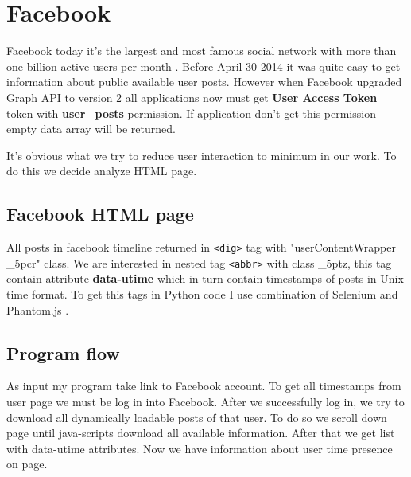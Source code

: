 \section{Facebook}

Facebook today it's the largest and most famous social network with more than one billion active users per month \cite{facebookStats}. Before April 30 2014 it was quite easy to get information about public available user posts. However when Facebook upgraded  Graph API to version 2 all applications now must get \textbf{User Access Token} token with \textbf{user\_posts} permission. If application don't get this permission empty data array will be returned. \par It's obvious what we try to reduce user interaction to minimum in our work. To do this we decide analyze HTML page.
\subsection{Facebook HTML page}
 All posts in facebook timeline returned in \texttt{<dig>} tag with "userContentWrapper \_5pcr" class. We are interested in nested tag \texttt{<abbr>} with class \_5ptz, this tag contain attribute \textbf{data-utime} which in turn contain timestamps of posts in Unix time format.
 To get this tags in Python code I use combination of Selenium \cite{Selenium} and Phantom.js \cite{Phantomjs}.
 \subsection{Program flow}
 As input my program take link to Facebook account. To get all timestamps from user page we must be log in into Facebook. After we successfully log in, we try to download all dynamically loadable posts of that user. To do so we scroll down page until java-scripts download all available information. After that we get list with data-utime attributes. Now we have information about user time presence on page.

